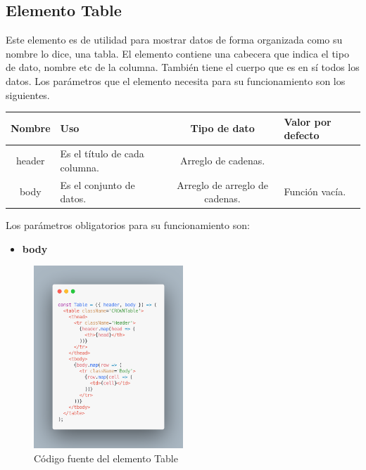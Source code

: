 \subsection{Elemento Table}
Este elemento es de utilidad para mostrar datos de forma organizada como su nombre lo dice, una tabla. El elemento contiene una cabecera que indica el tipo de dato, nombre etc de la columna. También tiene el cuerpo que es en sí todos los datos.
Los parámetros que el elemento necesita para su funcionamiento son los siguientes.
\newline
    \newline
    \begin{center}
     \begin{tabular}{ | c |  p{5cm}  | c | p{3cm} |} 
     \hline
     \textbf{Nombre} &  \textbf{Uso} &  \textbf{ Tipo de dato} &  \textbf{Valor por defecto}\\ [0.5ex] 
     \hline\hline
     header &  Es el título de cada columna. &   Arreglo de cadenas. & \\  [2.5ex] 
     \hline
     body &  Es el conjunto de datos. &   Arreglo de arreglo de cadenas. & Función vacía. \\  [2.5ex] 
     \hline
    \end{tabular}
    \end{center}
    \newline
        \newline
Los parámetros obligatorios para su funcionamiento son:
\begin{itemize}
\item \textbf{body} 
\end{itemize}
\newline
    \newline
    \begin{figure}[H]
    \centering
    \includegraphics[width=0.5\textwidth]{./Imagenes/8.33.png}
    \caption[Código fuente del elemento Table]{Código fuente del elemento Table}
    \end{figure}
\clearpage



